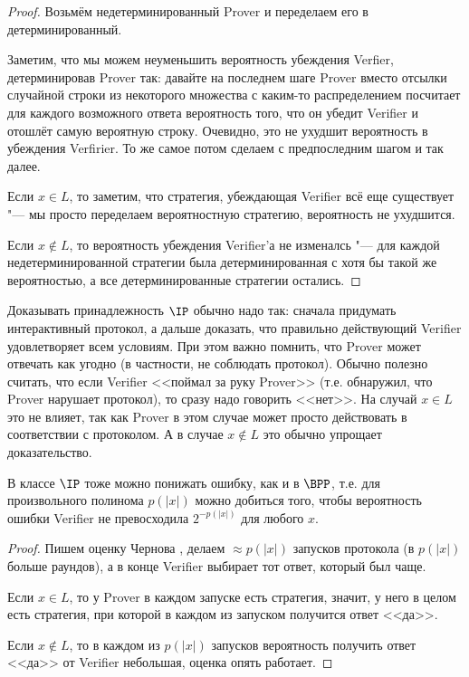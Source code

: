 	\begin{proof}	
		Возьмём недетерминированный Prover и переделаем его в детерминированный.

		Заметим, что мы можем неуменьшить вероятность убеждения Verfier, детерминировав Prover так: давайте на последнем шаге
		Prover вместо отсылки случайной строки из некоторого множества с каким-то распределением посчитает для каждого возможного
		ответа вероятность того, что он убедит Verifier и отошлёт самую вероятную строку.
		Очевидно, это не ухудшит вероятность в убеждения Verfirier.
		То же самое потом сделаем с предпоследним шагом и так далее.

		Если $x \in L$, то заметим, что стратегия, убеждающая Verifier всё еще существует "--- мы просто переделаем вероятностную стратегию, вероятность не ухудшится.

		Если $x \notin L$, то вероятность убеждения Verifier'а не изменалсь "--- для каждой недетерминированной стратегии была детерминированная с хотя бы такой же вероятностью,
		а все детерминированные стратегии остались.
	\end{proof}
	\begin{Rem}
		Доказывать принадлежность $\IP$ обычно надо так: сначала придумать интерактивный протокол, а дальше доказать, что правильно действующий Verifier удовлетворяет всем условиям.
		При этом важно помнить, что Prover может отвечать как угодно (в частности, не соблюдать протокол).
		Обычно полезно считать, что если Verifier <<поймал за руку Prover>> (т.е. обнаружил, что Prover нарушает протокол), то сразу надо говорить <<нет>>.
		На случай $x \in L$ это не влияет, так как Prover в этом случае может просто действовать в соответствии с протоколом.
		А в случае $x \notin L$ это обычно упрощает доказательство.
	\end{Rem}
	\begin{assertion}
		В классе $\IP$ тоже можно понижать ошибку, как и в $\BPP$, т.е. для произвольного полинома $p(|x|)$ можно добиться того, чтобы
		вероятность ошибки Verifier не превосходила $2^{-p(|x|)}$ для любого $x$.
	\end{assertion}
	\begin{proof}
		Пишем оценку Чернова \TODO,
		делаем $\approx p(|x|)$ запусков протокола (в $p(|x|)$ больше раундов), а в конце Verifier выбирает тот ответ, который был чаще.

		Если $x \in L$, то у Prover в каждом запуске есть стратегия, значит, у него в целом есть стратегия, при которой в каждом из запуском получится ответ <<да>>.

		Если $x \notin L$, то в каждом из $p(|x|)$ запусков вероятность получить ответ <<да>> от Verifier небольшая, оценка опять работает.
	\end{proof}
